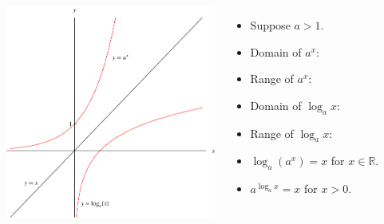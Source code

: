 \begin{frame}
\begin{columns}[c]
\includegraphics[height=7cm]{logarithms/pictures/07-03-logandexpb.pdf}%
\begin{itemize}
\item  Suppose $a > 1$.
\item<2-| alert@3-4>  Domain of $a^x$: 
\item<2-| alert@5-6>  Range of $a^x$: 
\item<2-| alert@7-8>  Domain of $\log_a x$: 
\item<2-| alert@9-10>  Range of $\log_a x$: 
\item<11->  $\log_a (a^x) = x$ for $x\in \mathbb{R}$.
\item<11->  $a^{\log_a x} = x$ for $x > 0$.
\end{itemize}
\end{columns}
\end{frame}
